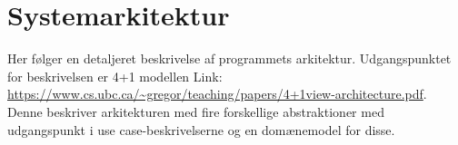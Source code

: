 \chapter{Systemarkitektur}
Her følger en detaljeret beskrivelse af programmets arkitektur. Udgangspunktet for beskrivelsen er 4+1 modellen Link: \url{https://www.cs.ubc.ca/~gregor/teaching/papers/4+1view-architecture.pdf}. Denne beskriver arkitekturen med fire forskellige abstraktioner med udgangspunkt i use case-beskrivelserne og en domænemodel for disse.






